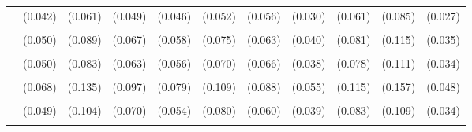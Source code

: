 \documentclass[3p, authoryear, review]{elsarticle} %
\begin{document}
\begin{landscape}
\begin{table}
{\begin{tabular}[t]{lcccccccccc}
 & (0.042) & (0.061) & (0.049) & (0.046) & (0.052) & (0.056) & (0.030) & (0.061) & (0.085) & (0.027)\\
\cellcolor{gray!6}{Basketball} & \cellcolor{gray!6}{-0.126 **} & \cellcolor{gray!6}{-0.236 ***} & \cellcolor{gray!6}{-0.393 ***} & \cellcolor{gray!6}{-0.386 ***} & \cellcolor{gray!6}{-0.309 ***} & \cellcolor{gray!6}{-0.154 **} & \cellcolor{gray!6}{-0.299 ***} & \cellcolor{gray!6}{-0.289 ***} & \cellcolor{gray!6}{-0.304 ***} & \cellcolor{gray!6}{-0.255 ***}\\
 & (0.050) & (0.089) & (0.067) & (0.058) & (0.075) & (0.063) & (0.040) & (0.081) & (0.115) & (0.035)\\
\cellcolor{gray!6}{Baseball} & \cellcolor{gray!6}{0.033} & \cellcolor{gray!6}{0.089} & \cellcolor{gray!6}{0.089} & \cellcolor{gray!6}{0.052} & \cellcolor{gray!6}{0.030} & \cellcolor{gray!6}{-0.164 **} & \cellcolor{gray!6}{0.154 ***} & \cellcolor{gray!6}{0.041} & \cellcolor{gray!6}{0.051} & \cellcolor{gray!6}{0.056 *}\\
 & (0.050) & (0.083) & (0.063) & (0.056) & (0.070) & (0.066) & (0.038) & (0.078) & (0.111) & (0.034)\\
\cellcolor{gray!6}{Football / Soccer} & \cellcolor{gray!6}{-0.372 ***} & \cellcolor{gray!6}{-0.983 ***} & \cellcolor{gray!6}{-0.553 ***} & \cellcolor{gray!6}{-0.614 ***} & \cellcolor{gray!6}{-0.967 ***} & \cellcolor{gray!6}{-0.228 ***} & \cellcolor{gray!6}{-0.540 ***} & \cellcolor{gray!6}{-0.428 ***} & \cellcolor{gray!6}{-0.910 ***} & \cellcolor{gray!6}{-0.506 ***}\\
 & (0.068) & (0.135) & (0.097) & (0.079) & (0.109) & (0.088) & (0.055) & (0.115) & (0.157) & (0.048)\\
\cellcolor{gray!6}{Tennis} & \cellcolor{gray!6}{0.454 ***} & \cellcolor{gray!6}{-0.531 ***} & \cellcolor{gray!6}{-0.059} & \cellcolor{gray!6}{0.452 ***} & \cellcolor{gray!6}{-0.196 **} & \cellcolor{gray!6}{0.666 ***} & \cellcolor{gray!6}{0.194 ***} & \cellcolor{gray!6}{0.061} & \cellcolor{gray!6}{0.337 ***} & \cellcolor{gray!6}{0.267 ***}\\
 & (0.049) & (0.104) & (0.070) & (0.054) & (0.080) & (0.060) & (0.039) & (0.083) & (0.109) & (0.034)\\
\cellcolor{gray!6}{Volleyball} & \cellcolor{gray!6}{0.546 ***} & \cellcolor{gray!6}{0.174} & \cellcolor{gray!6}{0.624 ***} & \cellcolor{gray!6}{0.316 ***} & \cellcolor{gray!6}{0.117} & \cellcolor{gray!6}{0.485 ***} & \cellcolor{gray!6}{0.521 ***} & \cellcolor{gray!6}{0.846 ***} & \cellcolor{gray!6}{0.108} & \cellcolor{gray!6}{0.539 ***}\\

\end{tabular}}
\end{table}
\end{landscape}
\end{document}
